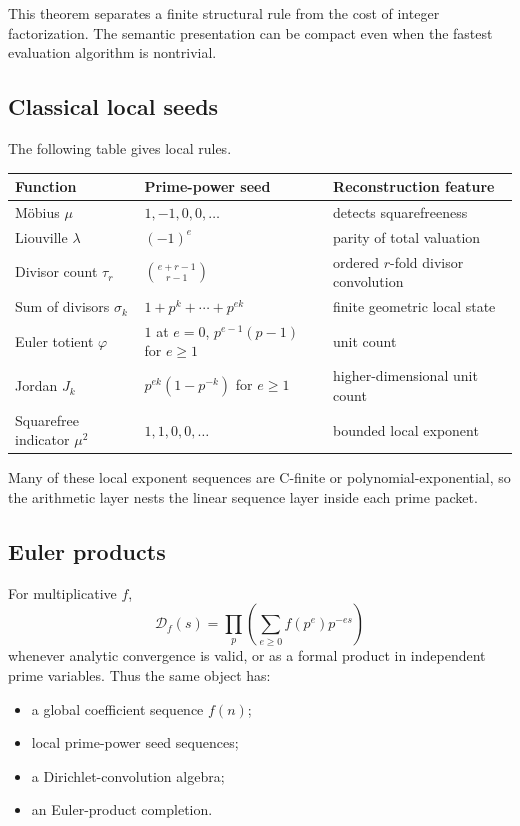 \documentclass[11pt]{article}
\theoremstyle{definition}\newtheorem{definition}[theorem]{Definition}\newtheorem{example}[theorem]{Example}\newtheorem{construction}[theorem]{Construction}\newtheorem{algorithm}[theorem]{Algorithm}\newtheorem{conjecture}[theorem]{Conjecture}\newtheorem{problem}[theorem]{Problem}
\theoremstyle{remark}\newtheorem{remark}[theorem]{Remark}\newtheorem{boundary}[theorem]{Boundary}\newtheorem{certificate}[theorem]{Computational Certificate}\newtheorem{classical}[theorem]{Classical Input}\newtheorem{principle}[theorem]{Structural Principle}
\begin{document}
This theorem separates a finite structural rule from the cost of integer factorization.  The semantic presentation can be compact even when the fastest evaluation algorithm is nontrivial.

\subsection{Classical local seeds}
The following table gives local rules.
\begin{center}
\begin{tabular}{L{.2\textwidth}L{.31\textwidth}L{.37\textwidth}}
\toprule
Function&Prime-power seed&Reconstruction feature\\
\midrule
M\"obius $\mu$&$1,-1,0,0,\ldots$&detects squarefreeness\\
Liouville $\lambda$&$(-1)^e$&parity of total valuation\\
Divisor count $\tau_r$&$\binom{e+r-1}{r-1}$&ordered $r$-fold divisor convolution\\
Sum of divisors $\sigma_k$&$1+p^k+\cdots+p^{ek}$&finite geometric local state\\
Euler totient $\varphi$&$1$ at $e=0$, $p^{e-1}(p-1)$ for $e\geq1$&unit count\\
Jordan $J_k$&$p^{ek}(1-p^{-k})$ for $e\geq1$&higher-dimensional unit count\\
Squarefree indicator $\mu^2$&$1,1,0,0,\ldots$&bounded local exponent\\
\bottomrule
\end{tabular}
\end{center}

Many of these local exponent sequences are C-finite or polynomial-exponential, so the arithmetic layer nests the linear sequence layer inside each prime packet.

\subsection{Euler products}
For multiplicative $f$,
\[
 \mathcal D_f(s)=\prod_p\left(\sum_{e\geq0}f(p^e)p^{-es}\right)
\]
whenever analytic convergence is valid, or as a formal product in independent prime variables.  Thus the same object has:
\begin{itemize}
\item a global coefficient sequence $f(n)$;
\item local prime-power seed sequences;
\item a Dirichlet-convolution algebra;
\item an Euler-product completion.
\end{itemize}
\end{document}
